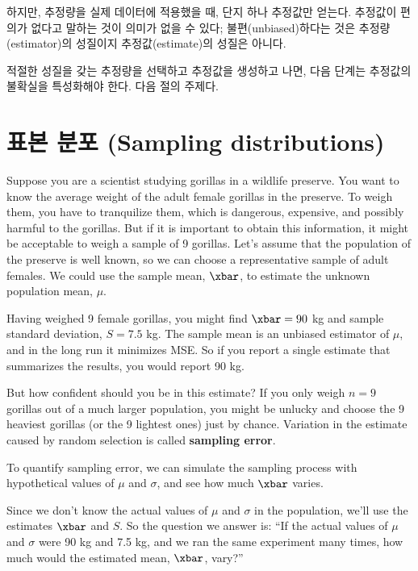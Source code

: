 
하지만, 추정량을 실제 데이터에 적용했을 때,
단지 하나 추정값만 얻는다. 추정값이 편의가 없다고 말하는 것이 의미가 없을 수 있다; 불편(unbiased)하다는 것은 추정량(estimator)의 성질이지 추정값(estimate)의 성질은 아니다.

적절한 성질을 갖는 추정량을 선택하고 추정값을 생성하고 나면, 다음 단계는 추정값의 불확실을 특성화해야 한다. 다음 절의 주제다.


\section{표본 분포 (Sampling distributions)}
\label{gorilla}

Suppose you are a scientist studying gorillas in a wildlife
preserve.  You want to know the average weight of the adult
female gorillas in the preserve.  To weigh them, you have
to tranquilize them, which is dangerous, expensive, and possibly
harmful to the gorillas.  But if it is important to obtain this
information, it might be acceptable to weigh a sample of 9
gorillas.  Let's assume that the population of the preserve is
well known, so we can choose a representative sample of adult
females.  We could use the sample mean, $\xbar$, to estimate the
unknown population mean, $\mu$.

Having weighed 9 female gorillas, you might find $\xbar=90$ kg and
sample standard deviation, $S=7.5$ kg.  The sample mean
is an unbiased estimator of $\mu$, and in the long run it
minimizes MSE.  So if you report a single
estimate that summarizes the results, you would report 90 kg.

But how confident should you be in this estimate?  If you only weigh
$n=9$ gorillas out of a much larger population, you might be unlucky
and choose the 9 heaviest gorillas (or the 9 lightest ones) just by
chance.  Variation in the estimate caused by random selection is
called {\bf sampling error}.

To quantify sampling error, we can simulate the
sampling process with hypothetical values of $\mu$ and $\sigma$, and
see how much $\xbar$ varies.

Since we don't know the actual values of 
$\mu$ and $\sigma$ in the population, we'll use the estimates
$\xbar$ and $S$.
So the question we answer is:
``If the actual values of $\mu$ and $\sigma$ were 90 kg and 7.5 kg,
and we ran the same experiment many times, how much would the
estimated mean, $\xbar$, vary?''

